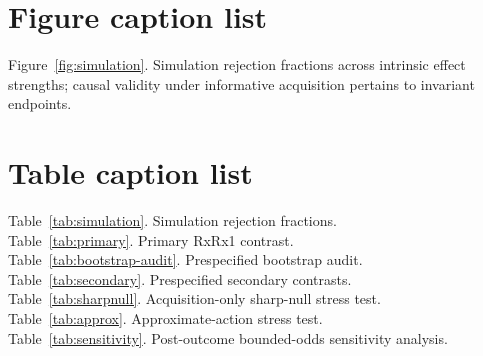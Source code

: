 \documentclass[11pt]{article}
\theoremstyle{plain}
\theoremstyle{definition}
\numberwithin{equation}{section}
\newcommand{\1}{\mathbf 1}
\begin{document}
\section*{Figure caption list}
\noindent Figure~\ref{fig:simulation}. Simulation rejection fractions across intrinsic effect strengths; causal validity under informative acquisition pertains to invariant endpoints.

\section*{Table caption list}
\noindent Table~\ref{tab:simulation}. Simulation rejection fractions.\\
Table~\ref{tab:primary}. Primary RxRx1 contrast.\\
Table~\ref{tab:bootstrap-audit}. Prespecified bootstrap audit.\\
Table~\ref{tab:secondary}. Prespecified secondary contrasts.\\
Table~\ref{tab:sharpnull}. Acquisition-only sharp-null stress test.\\
Table~\ref{tab:approx}. Approximate-action stress test.\\
Table~\ref{tab:sensitivity}. Post-outcome bounded-odds sensitivity analysis.
\end{document}
